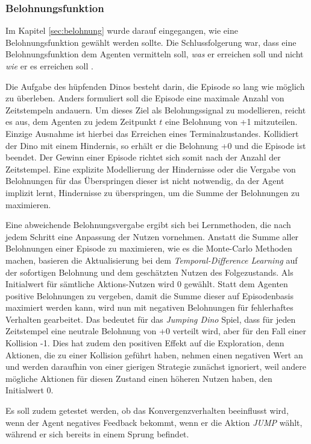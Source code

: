 \subsubsection{Belohnungsfunktion}\label{sec:JDbelohnungsfunktion}
Im Kapitel \ref{sec:belohnung} wurde darauf eingegangen, wie eine Belohnungsfunktion gewählt werden sollte. Die Schlussfolgerung war, dass eine Belohnungsfunktion dem Agenten vermitteln soll, \textit{was} er erreichen soll und nicht \textit{wie} er es erreichen soll \cite[S.~54]{Sutton1998}.
\par 
Die Aufgabe des hüpfenden Dinos besteht darin, die Episode so lang wie möglich zu überleben. Anders formuliert soll die Episode eine maximale Anzahl von Zeitstempeln andauern. Um dieses Ziel als Belohungssignal zu modellieren, reicht es aus, dem Agenten zu jedem Zeitpunkt $t$ eine Belohnung von +1 mitzuteilen. Einzige Ausnahme ist hierbei das Erreichen eines Terminalzustandes. Kollidiert der Dino mit einem Hindernis, so erhält er die Belohnung +0 und die Episode ist beendet. Der Gewinn einer Episode richtet sich somit nach der Anzahl der Zeitstempel. Eine explizite Modellierung der Hindernisse oder die Vergabe von Belohnungen für das Überspringen dieser ist nicht notwendig, da der Agent implizit lernt, Hindernisse zu überspringen, um die Summe der Belohnungen zu maximieren. 
\par 
Eine abweichende Belohnungsvergabe ergibt sich bei Lernmethoden, die nach jedem Schritt eine Anpassung der Nutzen vornehmen. Anstatt die Summe aller Belohnungen einer Episode zu maximieren, wie es die Monte-Carlo Methoden machen, basieren die Aktualisierung bei dem \textit{Temporal-Difference Learning} auf der sofortigen Belohnung und dem geschätzten Nutzen des Folgezustands. Als Initialwert für sämtliche Aktions-Nutzen wird 0 gewählt. Statt dem Agenten positive Belohnungen zu vergeben, damit die Summe dieser auf Episodenbasis maximiert werden kann, wird nun mit negativen Belohnungen für fehlerhaftes Verhalten gearbeitet. Das bedeutet für das \textit{Jumping Dino} Spiel, dass für jeden Zeitstempel eine neutrale Belohnung von +0 verteilt wird, aber für den Fall einer Kollision -1. Dies hat zudem den positiven Effekt auf die Exploration, denn Aktionen, die zu einer Kollision geführt haben, nehmen einen negativen Wert an und werden daraufhin von einer gierigen Strategie zunächst ignoriert, weil andere mögliche Aktionen für diesen Zustand einen höheren Nutzen haben, den Initialwert 0.
\par 
Es soll zudem getestet werden, ob das Konvergenzverhalten beeinflusst wird, wenn der Agent negatives Feedback bekommt, wenn er die Aktion \textit{JUMP} wählt, während er sich bereits in einem Sprung befindet. 
